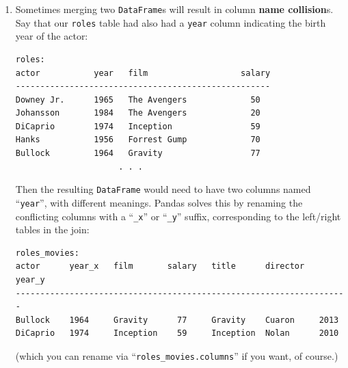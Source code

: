 \begin{enumerate}

Sometimes, we want to make sure that every row in the left (or right, or both)
\texttt{DataFrame} appears in the result \textit{at least once}, though, with
corresponding null values if necessary. We can do this by specifying
\texttt{\textquotesingle left\textquotesingle }, \texttt{\textquotesingle right\textquotesingle }, or \texttt{\textquotesingle outer\textquotesingle } as the value of the
\texttt{\textquotesingle how\textquotesingle } argument to \texttt{pd.merge()}:

\begin{Verbatim}[fontsize=\small,samepage=true,frame=single,framesep=3mm]
df = pd.merge(votes, contribs, left_on=['first_name',
    'last_name'], right_on=['candidate_first',
    'candidate_last'], how='outer')
\end{Verbatim}


\item Sometimes merging two \texttt{DataFrame}s will result in column
\textbf{name collision}s. Say that our \texttt{roles} table had also had a
\texttt{year} column indicating the birth year of the actor:

\begin{Verbatim}[fontsize=\small,samepage=true,frame=none]
                        roles:
actor           year   film                   salary
----------------------------------------------------
Downey Jr.      1965   The Avengers             50
Johansson       1984   The Avengers             20
DiCaprio        1974   Inception                59
Hanks           1956   Forrest Gump             70
Bullock         1964   Gravity                  77
                     . . .
\end{Verbatim}

Then the resulting \texttt{DataFrame} would need to have two columns named
``\texttt{year}'', with different meanings. Pandas solves this by renaming the
conflicting columns with a ``\texttt{\_x}'' or ``\texttt{\_y}'' suffix,
corresponding to the left/right tables in the join:

\begin{Verbatim}[fontsize=\scriptsize,samepage=true,frame=none]
                            roles_movies:
actor      year_x   film       salary   title      director   year_y
--------------------------------------------------------------------
Bullock    1964     Gravity      77     Gravity    Cuaron     2013
DiCaprio   1974     Inception    59     Inception  Nolan      2010
\end{Verbatim}

(which you can rename via ``\texttt{roles\_movies.columns}'' if you want, of
course.)

\end{enumerate}

